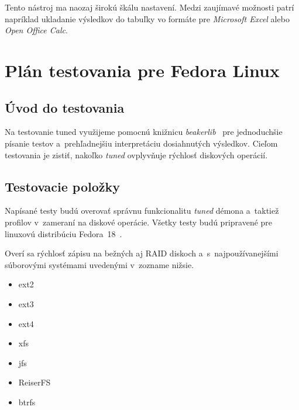 Tento nástroj ma naozaj širokú škálu nastavení. Medzi zaujímavé možnosti patrí napríklad ukladanie výsledkov do tabuľky vo formáte pre \emph{Microsoft Excel} alebo \emph{Open Office Calc}.

%
%

\chapter{Plán testovania pre Fedora Linux}


\section{Úvod do testovania}

Na testovanie tuned využijeme pomocnú knižnicu
\emph{beakerlib}~\cite{beakerlibHomepage} pre jednoduchšie písanie testov
a~prehľadnejšiu interpretáciu dosiahnutých výsledkov. Cieľom testovania je
zistiť, nakoľko \emph{tuned} ovplyvňuje rýchlosť diskových operácií.

\section{Testovacie položky}

Napísané testy budú overovať správnu funkcionalitu \emph{tuned} démona a~taktiež
profilov v~zameraní na diskové operácie. Všetky testy budú
pripravené pre linuxovú distribúciu Fedora~18~\cite{fedoraHomepage}.

Overí sa rýchlosť zápisu na bežných aj RAID diskoch a~s~najpoužívanejšími
súborovými systémami uvedenými v~zozname nižsie.

\begin{itemize}
    \item ext2
    \item ext3
    \item ext4
    \item xfs
    \item jfs
    \item ReiserFS
    \item btrfs
\end{itemize}


